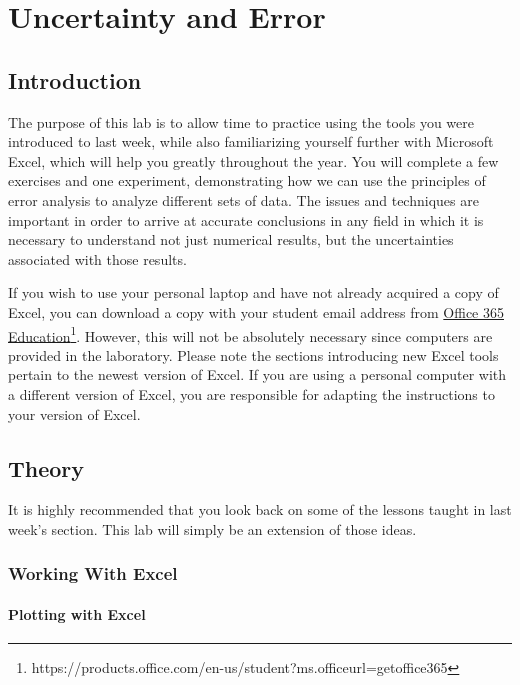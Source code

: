 
\chapter{Uncertainty and Error}
\label{chap:excel2}
\section{Introduction}

The purpose of this lab is to allow time to practice using the tools you were introduced to last week, while also familiarizing yourself further with Microsoft Excel, which will help you greatly throughout the year. You will complete a few exercises and one experiment, demonstrating how we can use the principles of error analysis to analyze different sets of data. The issues and techniques are important in order to arrive at accurate conclusions in any field in which it is necessary to understand not just numerical results, but the uncertainties associated with those results. \myskip

If you wish to use your personal laptop and have not already acquired a copy of Excel, you can download a copy with your student email address from
\href{https://products.office.com/en-us/student?ms.officeurl=getoffice365}{Office 365 Education}\footnote{https://products.office.com/en-us/student?ms.officeurl=getoffice365}. However, this will not be absolutely necessary since computers are provided in the laboratory. Please note the sections introducing new Excel tools pertain to the newest version of Excel. If you are using a personal computer with a different version of Excel, you are responsible for adapting the instructions to your version of Excel.

\section{Theory}

It is highly recommended that you look back on some of the lessons taught in last week's section. This lab will simply be an extension of those ideas.

\subsection{Working With Excel}
\subsubsection{Plotting with Excel}

